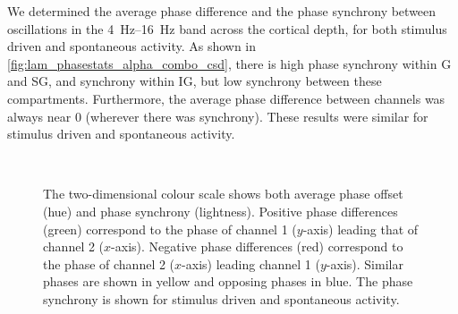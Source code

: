 

We determined the average phase difference and the phase synchrony between oscillations in the \SIrange{4}{16}{Hz} band across the cortical depth, for both stimulus driven and spontaneous activity.
As shown in \autoref{fig:lam_phasestats_alpha_combo_csd}, there is high phase synchrony within \ac{G} and \ac{SG}, and synchrony within \ac{IG}, but low synchrony between these compartments.
Furthermore, the average phase difference between channels was always near $0$ (wherever there was synchrony).
These results were similar for stimulus driven and spontaneous activity.

\begin{figure}[htbp]
    \centering
    \\
    \caption{
The two-dimensional colour scale shows both average phase offset (hue) and phase synchrony (lightness).
Positive phase differences (green) correspond to the phase of channel 1 ($y$-axis) leading that of channel 2 ($x$-axis).
Negative phase differences (red) correspond to the phase of channel 2 ($x$-axis) leading channel 1 ($y$-axis).
Similar phases are shown in yellow and opposing phases in blue.
The phase synchrony is shown for stimulus driven \protect{} and spontaneous \protect{} activity.
}
\label{fig:lam_phasestats_alpha_combo_csd}
\end{figure}


